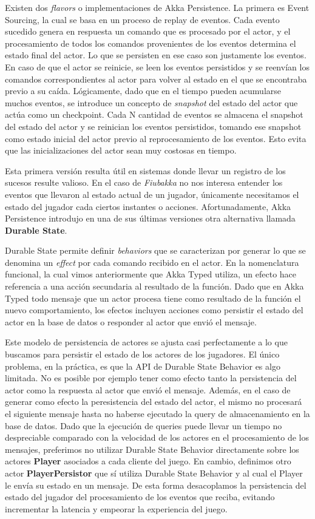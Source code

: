 Existen dos \textit{flavors} o implementaciones de Akka Persistence. La primera es Event Sourcing, la cual se basa en un proceso de replay de eventos. Cada evento sucedido genera en respuesta
un comando que es procesado por el actor, y el procesamiento de todos los comandos provenientes de los eventos determina el estado final del actor. Lo que se persisten en ese caso son justamente los eventos.
En caso de que el actor se reinicie, se leen los eventos persistidos y se reenvían los comandos correspondientes al actor para volver al estado en el que se encontraba previo a su caída.
Lógicamente, dado que en el tiempo pueden acumularse muchos eventos, se introduce un concepto de \textit{snapshot} del estado del actor que actúa como un checkpoint. Cada N cantidad de eventos
se almacena el snapshot del estado del actor y se reinician los eventos persistidos, tomando ese snapshot como estado inicial del actor previo al reprocesamiento de los eventos. Esto evita que las inicializaciones
del actor sean muy costosas en tiempo.

Esta primera versión resulta útil en sistemas donde llevar un registro de los sucesos resulte valioso. En el caso de \textit{Fiubakka} no nos interesa entender los eventos
que llevaron al estado actual de un jugador, únicamente necesitamos el estado del jugador cada ciertos instantes o acciones.
Afortunadamente, Akka Persistence introdujo en una de sus últimas versiones otra alternativa llamada \textbf{Durable State}.

Durable State permite definir \textit{behaviors} que se caracterizan por generar lo que se denomina un \textit{effect} por cada comando recibido en el actor.
En la nomenclatura funcional, la cual vimos anteriormente que Akka Typed utiliza, un efecto hace referencia a una acción secundaria al resultado de la función.
Dado que en Akka Typed todo mensaje que un actor procesa tiene como resultado de la función el nuevo comportamiento, los efectos incluyen acciones como persistir el estado del actor
en la base de datos o responder al actor que envió el mensaje.

Este modelo de persistencia de actores se ajusta casi perfectamente a lo que buscamos para persistir el estado de los actores de los jugadores.
El único problema, en la práctica, es que la API de Durable State Behavior es algo limitada. No es posible por ejemplo tener como efecto tanto la persistencia del actor
como la respuesta al actor que envió el mensaje. Además, en el caso de generar como efecto la peresistencia del estado del actor, el mismo no procesará el siguiente mensaje hasta no haberse
ejecutado la query de almacenamiento en la base de datos. Dado que la ejecución de queries puede llevar un tiempo no despreciable comparado con la velocidad de los actores en el procesamiento de los mensajes,
preferimos no utilizar Durable State Behavior directamente sobre los actores \textbf{Player} asociados a cada cliente del juego.
En cambio, definimos otro actor \textbf{PlayerPersistor} que sí utiliza Durable State Behavior y al cual el Player le envía su estado en un mensaje.
De esta forma desacoplamos la persistencia del estado del jugador del procesamiento de los eventos que reciba, evitando incrementar la latencia y empeorar la experiencia del juego.


